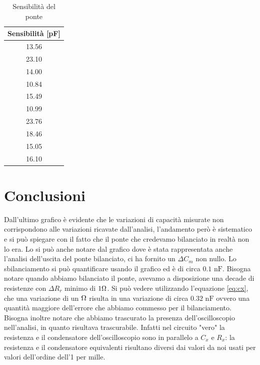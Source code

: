 \documentclass[12pt,]{article}
\begin{document}
\begin{table}[H]
\centering
\begin{tabular}{c}
\toprule
Sensibilità [pF]\\
\midrule
\rowcolor{black!20}13.56 \\
23.10\\
\rowcolor{black!20}14.00\\
10.84\\
\rowcolor{black!20}15.49\\
10.99\\
\rowcolor{black!20}23.76\\
18.46\\
\rowcolor{black!20}15.05\\
16.10\\
\bottomrule
\end{tabular}
\caption{Sensibilità del ponte}
\end{table}
\section{Conclusioni}
Dall'ultimo grafico è evidente che le variazioni di capacità misurate non corrispondono alle variazioni ricavate dall'analisi, l'andamento però è sistematico e si può spiegare con il fatto che il ponte che credevamo bilanciato in realtà non lo era. Lo si può anche notare dal grafico dove è stata rappresentata anche l'analisi dell'uscita del ponte bilanciato, ci ha fornito un $\Delta C_m$ non nullo. Lo sbilanciamento si può quantificare usando il grafico ed è di circa $0.1 \text{ nF}$. Bisogna notare quando abbiamo bilanciato il ponte, avevamo a disposizione una decade di resistenze con $\Delta R_r$ minimo di $1 \ohm$. Si può vedere utilizzando l'equazione \eqref{eq:cx}, che una variazione di un $\ohm$ risulta in una variazione di circa $0.32 \text{ nF}$ ovvero una quantità maggiore dell'errore che abbiamo commesso per il bilanciamento.\\
Bisogna inoltre notare che abbiamo trascurato la presenza dell'oscilloscopio nell'analisi, in quanto risultava trascurabile. Infatti nel circuito "vero" la resistenza e il condensatore dell'oscilloscopio sono in parallelo a $C_x$ e $R_x$: la resistenza e il condensatore equivalenti risultano diversi dai valori da noi usati per valori dell'ordine dell'1 per mille. 
\end{document}
